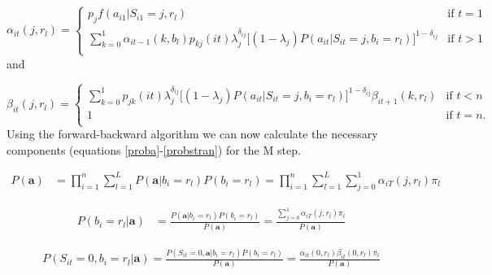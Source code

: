 \documentclass{article}
\begin{document}
\begin{equation} \label{fwd}
    \alpha_{it}(j,r_l) = \begin{cases}
        p_{j} f(a_{i1}|S_{i1}=j,r_l) & \text{if } t = 1 \\
        \sum_{k=0}^1 \alpha_{it-1} (k,b_l)p_{kj}(it)\lambda_j^{\delta_{ij}} \big[(1-\lambda_j)P(a_{it}|S_{it}=j,b_i=r_l)\big]^{1-\delta_{ij}}
            & \text{if } t > 1\\
    \end{cases}
\end{equation}
and
    
\begin{equation} \label{bkwd}
\beta_{it}(j,r_l) = \begin{cases} 
    \sum_{k=0}^1p_{jk}(it)\lambda_j^{\delta_{ij}} \big[(1-\lambda_j)P(a_{it}|S_{it}=j,b_i=r_l)\big]^{1-\delta_{ij}}\beta_{it+1}(k,r_l) 
        & \text{if } t < n \\
    1 & \text{if } t = n. \\
\end{cases}
\end{equation}
Using the forward-backward algorithm we can now calculate the necessary components (equations \ref{proba}-\ref{probstran}) for the M step. 


\begin{equation}\label{proba}
\begin{split}
    P(\textbf{a}) & = \prod_{i=1}^n \sum_{l=1}^L 
        P(\textbf{a}|b_{i}=r_l)P(b_{i}=r_l) = 
    \prod_{i=1}^n \sum_{l=1}^L \sum_{j=0}^1 \alpha_{iT}(j,r_l)\pi_l 
\end{split}
\end{equation}

\begin{equation}\label{probl}
\begin{split}
    P(b_{i}=r_l|\textbf{a}) & = \frac{P(\textbf{a}|b_{i}=r_l)P(b_{i}=r_l)}{P(\textbf{a})} = 
    \frac{\sum_{j=0}^1 \alpha_{iT}(j,r_l)\pi_l }{P(\textbf{a})}  
\end{split}
\end{equation}

\begin{equation}\label{probs0}
\begin{split}
    P(S_{it}=0,b_{i}=r_l|\textbf{a}) = \frac{P(S_{it}=0,\textbf{a}|b_{i}=r_l)
        P(b_{i}=r_l)}{P(\textbf{a})} = 
    \frac{\alpha_{it}(0,r_l)\beta_{it}(0,r_l)\pi_l }{P(\textbf{a})} 
\end{split}
\end{equation}
\end{document}

